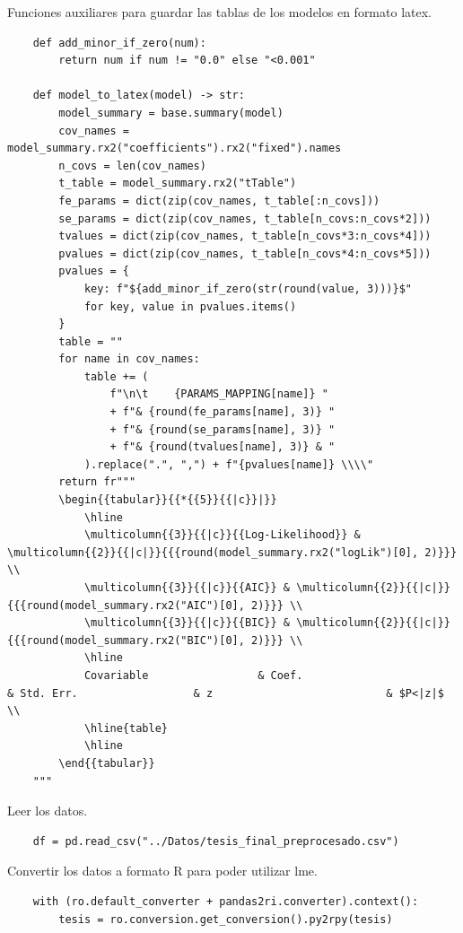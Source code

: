 \documentclass[spanish]{article}
\numberwithin{figure}{subsection}
\numberwithin{equation}{subsection}
\numberwithin{table}{subsection}
\begin{document}
Funciones auxiliares para guardar las tablas de los modelos en formato latex.

\begin{lstlisting}
	def add_minor_if_zero(num):
		return num if num != "0.0" else "<0.001"

	def model_to_latex(model) -> str:
		model_summary = base.summary(model)
		cov_names = model_summary.rx2("coefficients").rx2("fixed").names
		n_covs = len(cov_names)
		t_table = model_summary.rx2("tTable")
		fe_params = dict(zip(cov_names, t_table[:n_covs]))
		se_params = dict(zip(cov_names, t_table[n_covs:n_covs*2]))
		tvalues = dict(zip(cov_names, t_table[n_covs*3:n_covs*4]))
		pvalues = dict(zip(cov_names, t_table[n_covs*4:n_covs*5]))
		pvalues = {
			key: f"${add_minor_if_zero(str(round(value, 3)))}$"
			for key, value in pvalues.items()
		}
		table = ""
		for name in cov_names:
			table += (
				f"\n\t    {PARAMS_MAPPING[name]} "
				+ f"& {round(fe_params[name], 3)} "
				+ f"& {round(se_params[name], 3)} "
				+ f"& {round(tvalues[name], 3)} & "
			).replace(".", ",") + f"{pvalues[name]} \\\\"
		return fr"""
		\begin{{tabular}}{{*{{5}}{{|c}}|}}
			\hline
			\multicolumn{{3}}{{|c}}{{Log-Likelihood}} & \multicolumn{{2}}{{|c|}}{{{round(model_summary.rx2("logLik")[0], 2)}}} \\
			\multicolumn{{3}}{{|c}}{{AIC}} & \multicolumn{{2}}{{|c|}}{{{round(model_summary.rx2("AIC")[0], 2)}}} \\
			\multicolumn{{3}}{{|c}}{{BIC}} & \multicolumn{{2}}{{|c|}}{{{round(model_summary.rx2("BIC")[0], 2)}}} \\
			\hline
			Covariable				   & Coef.                         & Std. Err.                  & z                           & $P<|z|$  \\
			\hline{table}
			\hline
		\end{{tabular}}
	"""
\end{lstlisting}

Leer los datos.

\begin{lstlisting}
	df = pd.read_csv("../Datos/tesis_final_preprocesado.csv")
\end{lstlisting}

Convertir los datos a formato R para poder utilizar lme.

\begin{lstlisting}
	with (ro.default_converter + pandas2ri.converter).context():
    	tesis = ro.conversion.get_conversion().py2rpy(tesis)
\end{lstlisting}
\end{document}
